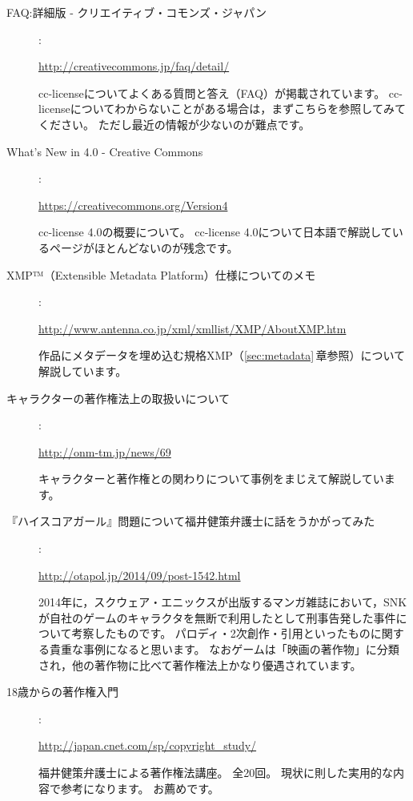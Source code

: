 \documentclass{ltjsarticle}
\begin{document}
\begin{description}

\item[FAQ:詳細版 - クリエイティブ・コモンズ・ジャパン] :\par
    \url{http://creativecommons.jp/faq/detail/}\par
    cc-licenseについてよくある質問と答え（FAQ）が掲載されています。
    cc-licenseについてわからないことがある場合は，まずこちらを参照してみてください。
    ただし最近の情報が少ないのが難点です。

\item[What's New in 4.0 - Creative Commons] :\par
    \url{https://creativecommons.org/Version4}\par
    cc-license 4.0の概要について。
    cc-license 4.0について日本語で解説しているページがほとんどないのが残念です。

\item[XMP™（Extensible Metadata Platform）仕様についてのメモ] :\par
    \url{http://www.antenna.co.jp/xml/xmllist/XMP/AboutXMP.htm}\par
    作品にメタデータを埋め込む規格XMP（\ref{sec:metadata}\,章参照）について解説しています。

\item[キャラクターの著作権法上の取扱いについて] :\par
    \url{http://onm-tm.jp/news/69}\par
    キャラクターと著作権との関わりについて事例をまじえて解説しています。

\item[『ハイスコアガール』問題について福井健策弁護士に話をうかがってみた] :\par
    \url{http://otapol.jp/2014/09/post-1542.html}\par
    2014年に，スクウェア・エニックスが出版するマンガ雑誌において，SNKが自社のゲームのキャラクタを無断で利用したとして刑事告発した事件について考察したものです。
    パロディ・2次創作・引用といったものに関する貴重な事例になると思います。
    なおゲームは「映画の著作物」に分類され，他の著作物に比べて著作権法上かなり優遇されています。

\item[18歳からの著作権入門] :\par
    \url{http://japan.cnet.com/sp/copyright_study/}\par
    福井健策弁護士による著作権法講座。
    全20回。
    現状に則した実用的な内容で参考になります。
    お薦めです。

\end{description}
\end{document}
